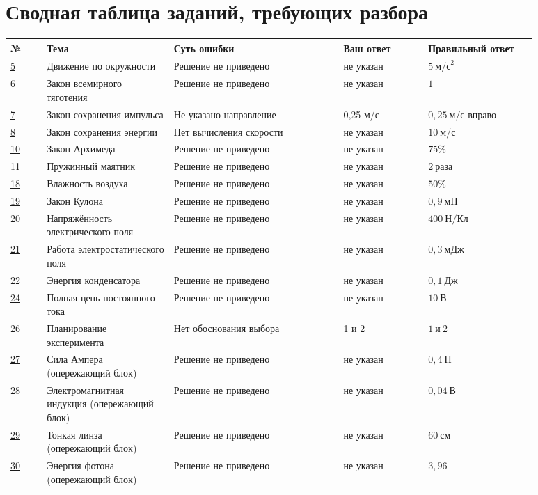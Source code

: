 \documentclass[11pt,a4paper]{article}
\begin{document}
\section*{Сводная таблица заданий, требующих разбора}
\small
\begin{longtable}{@{}p{0.065\linewidth}p{0.21\linewidth}p{0.28\linewidth}p{0.145\linewidth}p{0.18\linewidth}@{}}
\toprule
\textbf{№} & \textbf{Тема} & \textbf{Суть ошибки} & \textbf{Ваш ответ} & \textbf{Правильный ответ}\\
\midrule
\endhead
\hyperref[task:5]{5} & Движение по окружности & Решение не приведено & не указан & $5\ \text{м/с}^2$\\
\midrule
\hyperref[task:6]{6} & Закон всемирного тяготения & Решение не приведено & не указан & $1$\\
\midrule
\hyperref[task:7]{7} & Закон сохранения импульса & Не указано направление & 0,25 м/с & $0{,}25\ \text{м/с вправо}$\\
\midrule
\hyperref[task:8]{8} & Закон сохранения энергии & Нет вычисления скорости & не указан & $10\ \text{м/с}$\\
\midrule
\hyperref[task:10]{10} & Закон Архимеда & Решение не приведено & не указан & $75\%$\\
\midrule
\hyperref[task:11]{11} & Пружинный маятник & Решение не приведено & не указан & $2\ \text{раза}$\\
\midrule
\hyperref[task:18]{18} & Влажность воздуха & Решение не приведено & не указан & $50\%$\\
\midrule
\hyperref[task:19]{19} & Закон Кулона & Решение не приведено & не указан & $0{,}9\ \text{мН}$\\
\midrule
\hyperref[task:20]{20} & Напряжённость электрического поля & Решение не приведено & не указан & $400\ \text{Н/Кл}$\\
\midrule
\hyperref[task:21]{21} & Работа электростатического поля & Решение не приведено & не указан & $0{,}3\ \text{мДж}$\\
\midrule
\hyperref[task:22]{22} & Энергия конденсатора & Решение не приведено & не указан & $0{,}1\ \text{Дж}$\\
\midrule
\hyperref[task:24]{24} & Полная цепь постоянного тока & Решение не приведено & не указан & $10\ \text{В}$\\
\midrule
\hyperref[task:26]{26} & Планирование эксперимента & Нет обоснования выбора & 1 и 2 & $1\ \text{и}\ 2$\\
\midrule
\hyperref[task:27]{27} & Сила Ампера (опережающий блок) & Решение не приведено & не указан & $0{,}4\ \text{Н}$\\
\midrule
\hyperref[task:28]{28} & Электромагнитная индукция (опережающий блок) & Решение не приведено & не указан & $0{,}04\ \text{В}$\\
\midrule
\hyperref[task:29]{29} & Тонкая линза (опережающий блок) & Решение не приведено & не указан & $60\ \text{см}$\\
\midrule
\hyperref[task:30]{30} & Энергия фотона (опережающий блок) & Решение не приведено & не указан & $3{,}96$\\
\bottomrule
\end{longtable}
\end{document}
